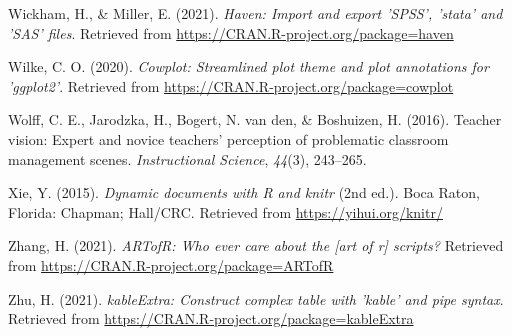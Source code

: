 \documentclass[
  man,floatsintext]{apa6}
\newlength{\cslhangindent}
\newlength{\cslentryspacingunit} %
\newenvironment{CSLReferences}[2] %
 {%
  \setlength{\parindent}{0pt}
  \ifodd #1
  \let\oldpar\par
  \def\par{\hangindent=\cslhangindent\oldpar}
  \fi
  \setlength{\parskip}{#2\cslentryspacingunit}
 }%
 {}
\begin{document}
\begin{CSLReferences}{1}{0}
\leavevmode{}%
Wickham, H., \& Miller, E. (2021). \emph{Haven: Import and export 'SPSS', 'stata' and 'SAS' files}. Retrieved from \url{https://CRAN.R-project.org/package=haven}

\leavevmode{}%
Wilke, C. O. (2020). \emph{Cowplot: Streamlined plot theme and plot annotations for 'ggplot2'}. Retrieved from \url{https://CRAN.R-project.org/package=cowplot}

\leavevmode{}%
Wolff, C. E., Jarodzka, H., Bogert, N. van den, \& Boshuizen, H. (2016). Teacher vision: Expert and novice teachers' perception of problematic classroom management scenes. \emph{Instructional Science}, \emph{44}(3), 243--265.

\leavevmode{}%
Xie, Y. (2015). \emph{Dynamic documents with {R} and knitr} (2nd ed.). Boca Raton, Florida: Chapman; Hall/CRC. Retrieved from \url{https://yihui.org/knitr/}

\leavevmode{}%
Zhang, H. (2021). \emph{ARTofR: Who ever care about the {[}art of r{]} scripts?} Retrieved from \url{https://CRAN.R-project.org/package=ARTofR}

\leavevmode{}%
Zhu, H. (2021). \emph{kableExtra: Construct complex table with 'kable' and pipe syntax}. Retrieved from \url{https://CRAN.R-project.org/package=kableExtra}

\end{CSLReferences}

\endgroup


\clearpage
\renewcommand{\listfigurename}{Figure captions}

\clearpage
\renewcommand{\listtablename}{Table captions}
\end{document}
